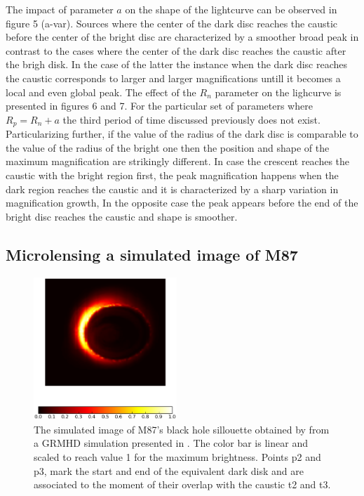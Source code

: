 The impact of parameter $a$ on the shape of the lightcurve can be observed in figure 5 (a-var). Sources where 
the center of the dark disc reaches the caustic before the center of the bright disc are characterized by a smoother
broad peak in contrast to the cases where the center of the dark disc reaches the caustic after the brigh disk.
In the case of the latter the instance when the dark disc reaches the caustic corresponds to larger and
larger magnifications untill it becomes a local and even global peak. The effect of the $R_n$  parameter on the
lighcurve is presented in figures 6 and 7. For the particular set of parameters where $R_p = R_n +a$ the third
period of time discussed previously does not exist. Particularizing further, if the value of the radius of the dark
disc is comparable to the value of the radius of the bright one then the position and shape of the maximum magnification
 are strikingly different. In case the crescent reaches the caustic with the bright region first, the peak magnification
 happens when the dark region reaches the caustic and it is characterized by a sharp variation in magnification growth,
In the opposite case the peak appears before the end of the bright disc reaches the caustic and shape is smoother. \\


\subsection{Microlensing a simulated image of M87}

\begin{figure}
\centering
        \includegraphics[width = 0.48\textwidth]{plots/M87_image.eps}
\caption{\label{fig:M87_image} The simulated image of M87's black hole sillouette obtained by \citep{2012MNRAS.421.1517D} from a GRMHD simulation presented in \citep{2009MNRAS.394L.126M}. The color bar is linear and scaled to reach value 1 for the maximum brightness. Points p2 and p3, mark the start and end of the equivalent dark disk and are associated to the moment of their overlap with the caustic t2 and t3.}
\end{figure}


